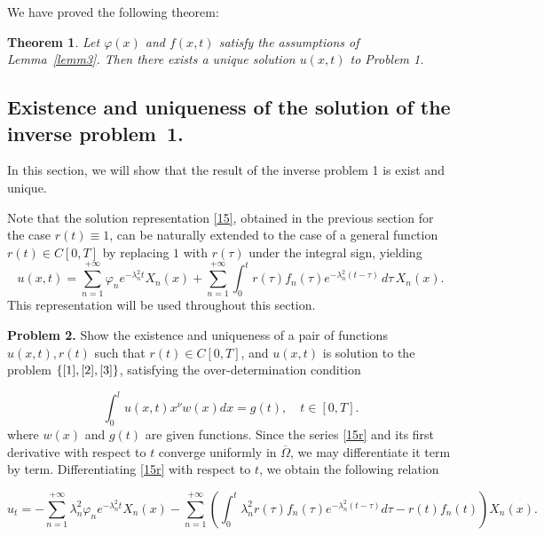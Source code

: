 \documentclass[reqno]{amsart}
\newtheorem{thm}{Theorem}[section]
\theoremstyle{definition}
\numberwithin{equation}{section}
\begin{document}
 We have proved the following theorem:

\begin{thm}\label{theorem2}
Let $\varphi(x)$ and $f(x,t)$ satisfy the assumptions of Lemma~\ref{lemm3}.
Then there exists a unique solution $u(x, t)$ to Problem 1.
\end{thm}



\subsection{Existence and uniqueness of the solution of the inverse problem~1.}
In this section, we will show that the result of the inverse problem 1  is exist and unique.


Note that the solution representation \eqref{15}, obtained in the previous 
section for the case $r(t) \equiv 1$, can be naturally extended to the case 
of a general function $r(t) \in C[0,T]$ by replacing $1$ with $r(\tau)$ 
under the integral sign, yielding
\begin{equation}\label{15r}
    u(x,t) = \sum_{n=1}^{+\infty} \varphi_n e^{-\lambda_n^2 t} X_n(x)
    + \sum_{n=1}^{+\infty} \int_0^t r(\tau) f_n(\tau) 
    e^{-\lambda_n^2(t-\tau)}\, d\tau \, X_n(x).
\end{equation}
This representation will be used throughout this section.

\textbf{Problem 2.} Show the existence and uniqueness of a pair of functions $u(x, t), r(t)$ such that $r(t) \in C[0, T]$, and $u(x, t)$ is solution to the problem $\{\eqref{1}, \eqref{2},\eqref{3}\}$, satisfying the over-determination condition

\begin{equation}\label{1.6}
    \int_0^l u(x, t)x^{\nu} w(x) d x=g(t), \quad t \in[0, T].
\end{equation}
where $w(x)$ and $g(t)$ are given functions.
 Since the series \eqref{15r} and its first derivative with respect to $t$ converge uniformly in $\overline{\Omega}$, we may differentiate it term by term. Differentiating \eqref{15r} with respect to $t$, we obtain the following relation

\begin{equation*}
    u_t=-\sum_{n=1}^{+\infty} \lambda_n^2 \varphi_n e^{-\lambda_n^2 t} X_n(x)-\sum_{n=1}^{+\infty}\left(\int_0^t \lambda_n ^2r(\tau) f_n(\tau) e^{-\lambda_n^2(t-\tau)} d \tau-r(t) f_n(t)\right) X_n(x).
\end{equation*}
\end{document}
